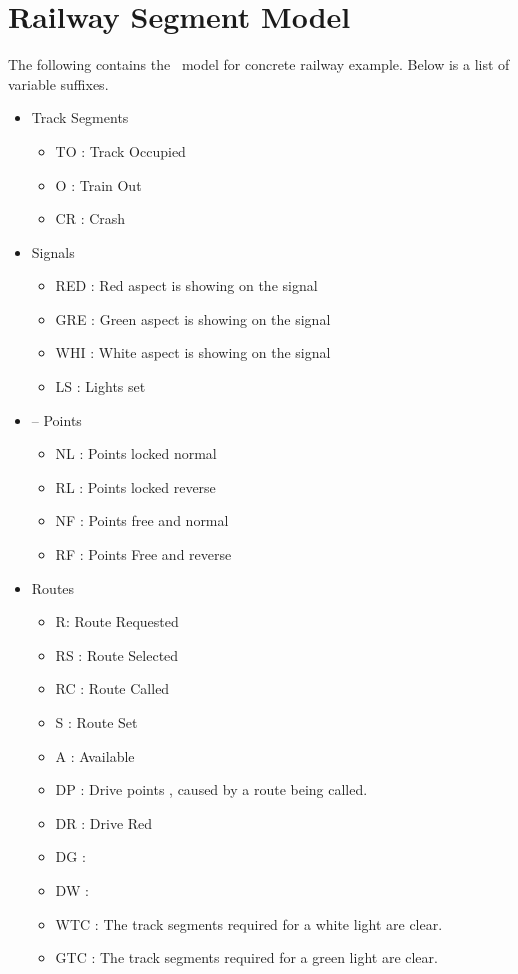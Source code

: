 \section{Railway Segment Model}

The following contains the \scade \ model for concrete railway example. Below
is a list of variable suffixes.
 

\begin{itemize}

\item Track Segments
\begin{itemize}
\item TO : Track Occupied
\item O : Train Out
\item CR : Crash
\end{itemize}

\item Signals
\begin{itemize}
\item RED : Red aspect is showing on the signal
\item GRE : Green aspect is showing on the signal
\item WHI : White aspect is showing on the signal
\item LS  : Lights set
\end{itemize}



\item -- Points
\begin{itemize}
\item NL : Points locked normal
\item RL : Points locked reverse
\item NF : Points free and normal
\item RF : Points Free and reverse
\end{itemize}
\item Routes

\begin{itemize}
\item R: Route Requested
\item RS : Route Selected
\item RC : Route Called
\item S : Route Set
\item A : Available
\item DP : Drive points , caused by a route being called.
\item DR : Drive Red
\item DG :
\item DW :



\item WTC : The track segments required for a white light are clear.
\item GTC : The track segments required for a green light are clear.

\end{itemize}



\end{itemize}

